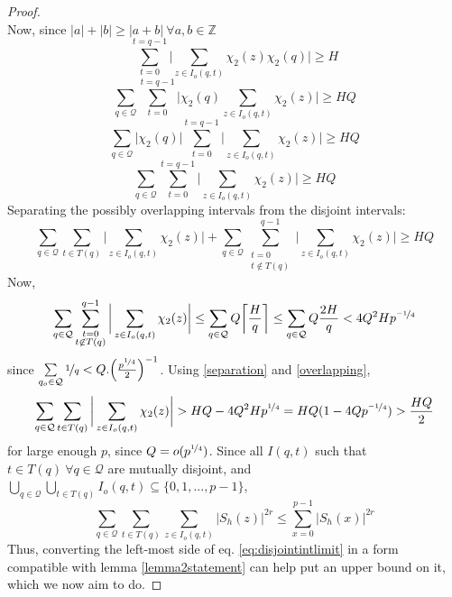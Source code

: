 \documentclass{report}
\begin{document}
\begin{proof}
\begin{equation}
\end{equation}
Now, since $\lvert a\rvert + \lvert b\rvert \geq \lvert a+b \rvert\  \forall a,b \in \mathbb{Z}$
$$\sum\limits_{t=0}^{t=q-1}\bigg \lvert\sum\limits_{z\in I_o(q,t)}\chi_2(z)\chi_2(q)\bigg \rvert \geq H$$
$$\sum_{q\in\mathcal{Q}}\sum\limits_{t=0}^{t=q-1}\bigg \lvert\chi_2(q)\sum\limits_{z\in I_o(q,t)}\chi_2(z)\bigg \rvert \geq HQ$$
$$\sum_{q\in\mathcal{Q}}\bigg \lvert\chi_2(q)\bigg\rvert\sum\limits_{t=0}^{t=q-1}\bigg\lvert\sum\limits_{z\in I_o(q,t)}\chi_2(z)\bigg \rvert \geq HQ$$
$$\sum_{q\in\mathcal{Q}}\sum\limits_{t=0}^{t=q-1}\bigg \lvert\sum\limits_{z\in I_o(q,t)}\chi_2(z)\bigg \rvert \geq HQ$$
Separating the possibly overlapping intervals from the disjoint intervals:
\begin{equation} \label{separation}
\sum_{q\in\mathcal{Q}}\sum\limits_{t\in T(q)}\bigg \lvert\sum\limits_{z\in I_o(q,t)}\chi_2(z)\bigg \rvert+\sum_{q\in\mathcal{Q}}\sum\limits_{\substack{t=0\\t\not \in T(q)}}^{q-1}\bigg \lvert\sum\limits_{z\in I_o(q,t)}\chi_2(z)\bigg \rvert \geq HQ
\end{equation}
Now,
\begin{equation} \label{overlapping}
\sum_{q\in\mathcal{Q}}\sum\limits_{\substack{t=0\\t\not \in T(q)}}^{q-1}\bigg\lvert\sum\limits_{z\in I_o(q,t) }\chi_2(z)\bigg \rvert \leq \sum\limits_{q\in\mathcal{Q}} Q\bigg\lceil\frac{H}{q}\bigg\rceil \leq \sum\limits_{q\in\mathcal{Q}} Q\frac{2H}{q} < 4Q^2 Hp^{\nicefrac{-1}{4}}
\end{equation}
since $\sum\limits_{q_o\in\mathcal{Q}} \nicefrac{1}{q} < Q.\Big(\frac{p^{\nicefrac{1}{4}}}{2}\Big)^{-1}$. Using \ref{separation} and \ref{overlapping},
\begin{equation} \label{eq:disjointintlimit}
\sum_{q\in\mathcal{Q}}\sum\limits_{t\in T(q)}\bigg \lvert\sum\limits_{z\in I_o(q,t)}\chi_2(z)\bigg \rvert > HQ - 4Q^2 Hp^{\nicefrac{1}{4}}=HQ(1-4Qp^{\nicefrac{-1}{4}})>\frac{HQ}{2}
\end{equation}
for large enough $p$, since $Q=o(p^{\nicefrac{1}{4}})$. Since all $I(q,t)$ such that $t\in T(q)\ \forall q\in\mathcal{Q}$ are mutually disjoint, and $\bigcup\limits_{q\in\mathcal{Q}}\bigcup\limits_{t\in T(q)} I_o(q,t) \subseteq \{0,1,...,p-1\}$,
\[\sum\limits_{q\in\mathcal{Q}}\sum\limits_{t\in T(q)}\sum\limits_{z\in I_o(q,t)}\lvert S_h(z) \rvert ^{2r} \leq \sum\limits_{x=0}^{p-1}\lvert S_h(x)\rvert ^{2r}\]
Thus, converting the left-most side of eq. \ref{eq:disjointintlimit} in a form compatible with lemma \ref{lemma2statement} can help put an upper bound on it, which we now aim to do.

\end{proof}
\end{document}
